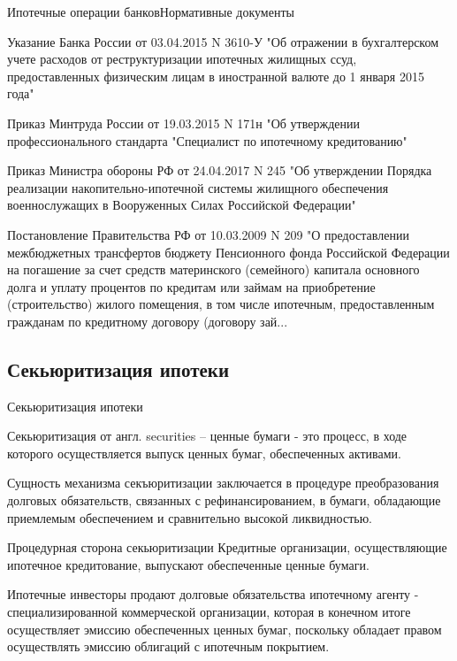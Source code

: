 \documentclass[_Banking_p2.tex]{subfiles}
\begin{document}
\begin{frame}[allowframebreaks]{Ипотечные операции банков}{Нормативные документы}
\begin{thebibliography}{10}
Указание Банка России от 03.04.2015 N 3610-У "Об отражении в бухгалтерском учете расходов от реструктуризации ипотечных жилищных ссуд, предоставленных физическим лицам в иностранной валюте до 1 января 2015 года"

Приказ Минтруда России от 19.03.2015 N 171н "Об утверждении профессионального стандарта "Специалист по ипотечному кредитованию"

Приказ Министра обороны РФ от 24.04.2017 N 245 "Об утверждении Порядка реализации накопительно-ипотечной системы жилищного обеспечения военнослужащих в Вооруженных Силах Российской Федерации"

Постановление Правительства РФ от 10.03.2009 N 209 "О предоставлении межбюджетных трансфертов бюджету Пенсионного фонда Российской Федерации на погашение за счет средств материнского (семейного) капитала основного долга и уплату процентов по кредитам или займам на приобретение (строительство) жилого помещения, в том числе ипотечным, предоставленным гражданам по кредитному договору (договору зай...

\end{thebibliography}
\end{frame}

\subsection{Секьюритизация ипотеки}
\begin{frame} {Секьюритизация ипотеки}

\begin{block}{Секьюритизация от англ. securities – ценные бумаги}
\quad
- это процесс, в ходе которого осуществляется выпуск ценных бумаг, обеспеченных активами.
\end{block}

Сущность механизма секъюритизации заключается в процедуре преобразования долговых обязательств, связанных с рефинансированием, в бумаги, обладающие приемлемым обеспечением и сравнительно высокой ликвидностью.

\end{frame}

\begin{frame}{Процедурная сторона секьюритизации }
Кредитные организации, осуществляющие ипотечное кредитование, выпускают обеспеченные ценные бумаги. 

Ипотечные инвесторы продают долговые обязательства ипотечному агенту  - специализированной коммерческой организации, которая в конечном итоге осуществляет эмиссию обеспеченных ценных бумаг, поскольку обладает правом осуществлять эмиссию облигаций с ипотечным покрытием.
\end{frame}
\end{document}
